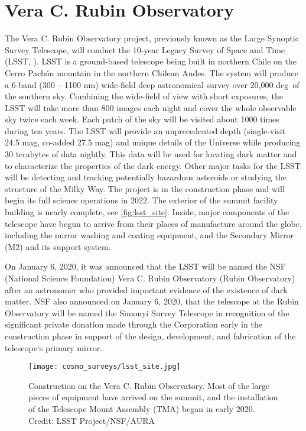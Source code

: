 \section{Vera C. Rubin Observatory}
The Vera C. Rubin Observatory project, previously known as the Large Synoptic Survey Telescope, will conduct the 10-year Legacy Survey of Space and Time (LSST, \cite{lsst}). LSST is a ground-based telescope being built in northern Chile on the Cerro Pach\'{o}n mountain in the northern Chilean Andes. The system will produce a 6-band (300 -- 1100 nm) wide-field deep astronomical survey over 20,000 deg\sq\ of the southern sky. Combining the wide-field of view with short exposures, the LSST will take more than 800 images each night and cover the whole observable sky twice each week. Each patch of the sky will be visited about 1000 times during ten years. The LSST will provide an unprecedented depth (single-visit 24.5 mag, co-added 27.5 mag) and unique details of the Universe while producing 30 terabytes of data nightly. This data will be used for locating dark matter and to characterize the properties of the dark energy. Other major tasks for the LSST will be detecting and tracking potentially hazardous asteroids or studying the structure of the Milky Way. The project is in the construction phase and will begin its full science operations in 2022. The exterior of the summit facility building is nearly complete, see \autoref{fig:lsst_site}. Inside, major components of the telescope have begun to arrive from their places of manufacture around the globe, including the mirror washing and coating equipment, and the Secondary Mirror (M2) and its support system.

On January 6, 2020, it was announced that the LSST will be named the NSF (National Science Foundation) Vera C. Rubin Observatory (Rubin Observatory) after an astronomer who provided important evidence of the existence of dark matter. NSF also announced on January 6, 2020, that the telescope at the Rubin Observatory will be named the Simonyi Survey Telescope in recognition of the significant private donation made through the Corporation early in the construction phase in support of the design, development, and fabrication of the telescope`s primary mirror.
\begin{figure}[htb]
    \centering
    \texttt{[image: cosmo\_surveys/lsst\_site.jpg]}
    \caption{Construction on the Vera C. Rubin Observatory. Most of the large pieces of equipment have arrived on the summit, and the installation of the Telescope Mount Assembly (TMA) began in early 2020. Credit: LSST Project/NSF/AURA}
    \label{fig:lsst_site}
\end{figure}

